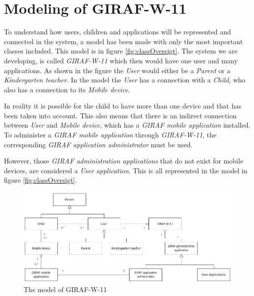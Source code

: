 \section{Modeling of GIRAF-W-11}
To understand how users, children and applications will be represented and connected in the system, a model has been made with only the most important classes included. This model is in figure \vref{fig:classOversigt}. The system we are developing, is called \emph{GIRAF-W-11} which then would have one user and many applications. As shown in the figure the \emph{User} would either be a \emph{Parent} or a \emph{Kindergarten teacher}. In the model the \emph{User} has a connection with a \emph{Child}, who also has a connection to its \emph{Mobile device}.

In reality it is possible for the child to have more than one device and that has been taken into account. This also means that there is an indirect connection between \emph{User} and \emph{Mobile device}, which has a \emph{GIRAF mobile application} installed. To administer a \emph{GIRAF mobile application} through \emph{GIRAF-W-11}, the corresponding \emph{GIRAF application administrator} must be used.

 However, those \emph{GIRAF administration applications} that do not exist for mobile devices, are considered a \emph{User application}. This is all represented in the model in figure \vref{fig:classOversigt}.


\begin{figure}[!ht]
	\centering
		\includegraphics[width=1.00\textwidth]{img/classOversigt.jpg}
	\caption{The model of GIRAF-W-11}
	\label{fig:classOversigt}
\end{figure}
\newpage